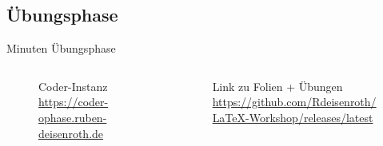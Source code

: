 \documentclass[
    ngerman,
    accentcolor=3b,
    dark_mode,
    fontsize= 12pt,
    a4paper,
    aspectratio=169,
    colorback=true,
    fancy_row_colors,
    leqno,
    fleqn,
    boxarc=3pt,
    fleqn,
]{algoslides}
\begin{document}
    \subsection{Übungsphase}
    \begin{frame}[c]
        \slidehead{}
         Minuten Übungsphase
        \begin{columns}[c]
            \begin{column}{.5\textwidth}
                \begin{figure}
                    \centering
                    \caption{Coder-Instanz\\\url{https://coder-ophase.ruben-deisenroth.de}}
                \end{figure}
            \end{column}%
            \begin{column}{.5\textwidth}
                \begin{figure}
                    \centering
                    \caption{Link zu Folien + Übungen\\\url{https://github.com/Rdeisenroth/LaTeX-Workshop/releases/latest}}
                \end{figure}
            \end{column}
        \end{columns}
    \end{frame}
\end{document}
